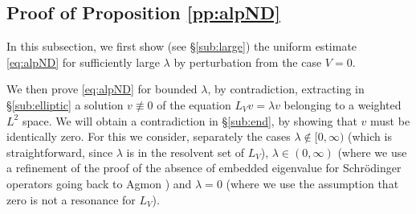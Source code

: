 \documentclass[10pt,leqno]{amsart}
\theoremstyle{definition}%
\theoremstyle{remark}
\numberwithin{equation}{section}
\renewcommand{\^}{\widehat}%
\begin{document}


\subsection{Proof of Proposition \ref{pp:alpND}}
In this subsection, we first show (see \S \ref{sub:large}) the uniform estimate \eqref{eq:alpND} for sufficiently large $\lambda$ by perturbation from the case $V=0$.

We then prove \eqref{eq:alpND} for bounded $\lambda$,  by contradiction, extracting in \S \ref{sub:elliptic} a solution $v\not\equiv0$ of the equation $L_V v=\lambda v$ belonging to a weighted $L^2$ space. We will obtain a contradiction in \S \ref{sub:end}, by showing that $v$ must be identically zero.  For this we consider,  separately the cases $\lambda \notin [0,\infty)$ (which is straightforward, since $\lambda$ is in the resolvent set of $L_V$), $\lambda \in (0,\infty)$ (where we use a refinement of the proof of the absence of embedded eigenvalue for Schr\"odinger operators going back to Agmon \cite{Agmon75}) and $\lambda=0$ (where we use the assumption that zero is not a resonance for $L_V$).
\end{document}
